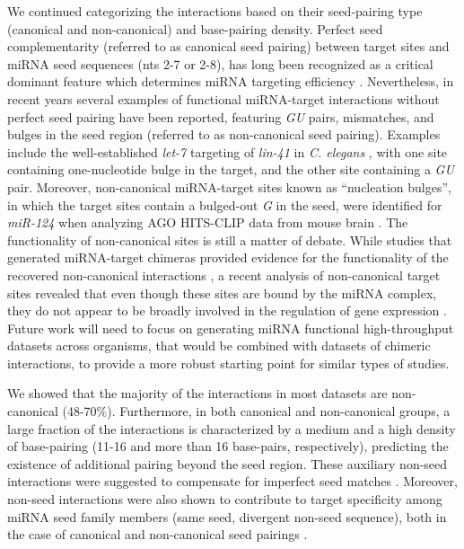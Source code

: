 \documentclass{bmcart}
\begin{document}
We continued categorizing the interactions based on their seed-pairing type (canonical and non-canonical) and base-pairing density. Perfect seed complementarity (referred to as canonical seed pairing) between target sites and miRNA seed sequences (nts 2-7 or 2-8), has long been recognized as a critical dominant feature which determines miRNA targeting efficiency \cite{bartel2009micrornas, lewis2005conserved, schirle2014structural}. Nevertheless, in recent years several examples of functional miRNA-target interactions without perfect seed pairing have been reported, featuring \textit{GU} pairs, mismatches, and bulges in the seed region (referred to as non-canonical seed pairing). Examples include the well-established \textit{let-7} targeting of \textit{lin-41} in \textit{C. elegans} \cite{slack2000lin, vella2004c}, with one site containing one-nucleotide bulge in the target, and the other site containing a \textit{GU} pair. Moreover, non-canonical miRNA-target sites known as “nucleation bulges”, in which the target sites contain a bulged-out \textit{G} in the seed, were identified for \textit{miR-124} when analyzing AGO HITS-CLIP data from mouse brain \cite{chi2012alternative}. The functionality of non-canonical sites is still a matter of debate. While studies that generated miRNA-target chimeras provided evidence for the functionality of the recovered non-canonical interactions \cite{helwak2013mapping,grosswendt2014unambiguous}, a recent analysis of non-canonical target sites revealed that even though these sites are bound by the miRNA complex, they do not appear to be broadly involved in the regulation of gene expression \cite{agarwal2015predicting}. Future work will need to focus on generating miRNA functional high-throughput datasets \cite{soriano2019functional} across organisms, that would be combined with datasets of chimeric interactions, to provide a more robust starting point for similar types of studies.


We showed that the majority of the interactions in most datasets are non-canonical (48-70\%). Furthermore, in both canonical and non-canonical groups, a large fraction of the interactions is characterized by a medium and a high density of base-pairing (11-16 and more than 16 base-pairs, respectively), predicting the existence of additional pairing beyond the seed region. These auxiliary non-seed interactions were suggested to compensate for imperfect seed matches \cite{brennecke2005principles, grimson2007microrna}. Moreover, non-seed interactions were also shown to contribute to target specificity among miRNA seed family members (same seed, divergent non-seed sequence), both in the case of canonical and non-canonical seed pairings \cite{broughton2016pairing, darnell_moore2015mirna}.
\end{document}
